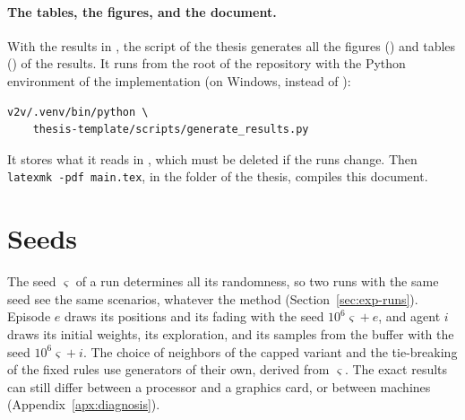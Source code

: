 \paragraph{The tables, the figures, and the document.}  With the results in , the script
 of the thesis generates all the figures () and tables
() of the results. It runs from the root of the repository with the Python environment of
the implementation (on Windows,  instead of ):
\begin{lstlisting}[style=shell]
v2v/.venv/bin/python \
    thesis-template/scripts/generate_results.py
\end{lstlisting}
It stores what it reads in , which must be deleted if the runs change. Then
\texttt{latexmk -pdf main.tex}, in the folder of the thesis, compiles this document.

\section{Seeds}

 The seed $\varsigma$ of a run determines all its randomness, so two runs with the same seed
see the same scenarios, whatever the method (Section~\ref{sec:exp-runs}). Episode $e$ draws its positions
and its fading with the seed $10^6 \varsigma + e$, and agent $i$ draws its initial weights, its exploration, and
its samples from the buffer with the seed $10^6 \varsigma + i$. The choice of neighbors of the capped variant and
the tie-breaking of the fixed rules use generators of their own, derived from $\varsigma$. The exact results
can still differ between a processor and a graphics card, or between machines (Appendix~\ref{apx:diagnosis}).

\endinput
